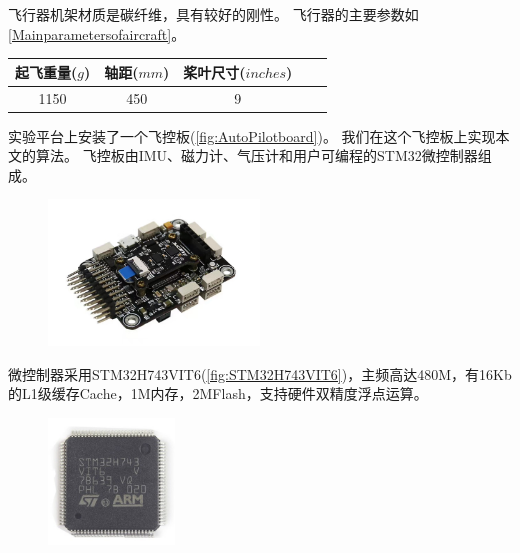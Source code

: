 \documentclass[
  type=master
]{gdutthesis}
\begin{document}
飞行器机架材质是碳纤维，具有较好的刚性。
飞行器的主要参数如\autoref{Mainparametersofaircraft}。
\begin{table}[h]
	\label{Mainparametersofaircraft}
	\begin{tabular}{ccccc}
		\toprule
		起飞重量($g$) & 轴距($mm$) & 桨叶尺寸($inches$)\\
		\midrule
		1150 & 450 & 9 \\ 
		\bottomrule 
	\end{tabular}
\end{table}

实验平台上安装了一个飞控板(\autoref{fig:AutoPilotboard})。
我们在这个飞控板上实现本文的算法。
飞控板由IMU、磁力计、气压计和用户可编程的STM32微控制器组成。
\begin{figure}[H]
	\centering
	\includegraphics[width=0.5\textwidth]{acfly.jpg}
	\label{fig:AutoPilotboard}
\end{figure}

微控制器采用STM32H743VIT6(\autoref{fig:STM32H743VIT6})，主频高达480M，有16Kb的L1级缓存Cache，1M内存，2MFlash，支持硬件双精度浮点运算。
\begin{figure}[H]
	\centering
	\includegraphics[width=0.3\textwidth]{St-Semiconductor-Chips-Electronic-Component-Lqfp-100-Stm32h743vit6.jpg}
	\label{fig:STM32H743VIT6}
\end{figure}
\end{document}
